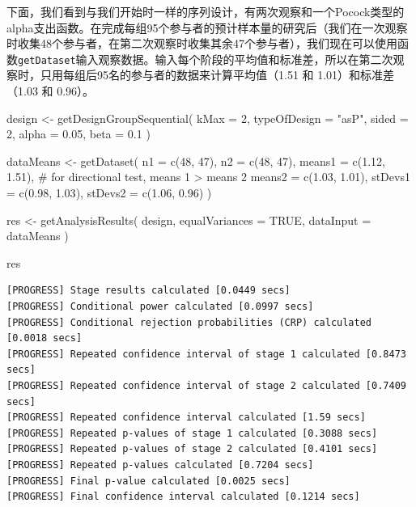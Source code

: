 \documentclass[
  letterpaper,
  DIV=11,
  numbers=noendperiod]{scrreprt}
\newenvironment{Shaded}{\begin{snugshade}}{\end{snugshade}}
\newcommand{\AttributeTok}[1]{\textcolor[rgb]{0.40,0.45,0.13}{#1}}
\newcommand{\CommentTok}[1]{\textcolor[rgb]{0.37,0.37,0.37}{#1}}
\newcommand{\ConstantTok}[1]{\textcolor[rgb]{0.56,0.35,0.01}{#1}}
\newcommand{\DecValTok}[1]{\textcolor[rgb]{0.68,0.00,0.00}{#1}}
\newcommand{\FloatTok}[1]{\textcolor[rgb]{0.68,0.00,0.00}{#1}}
\newcommand{\FunctionTok}[1]{\textcolor[rgb]{0.28,0.35,0.67}{#1}}
\newcommand{\NormalTok}[1]{\textcolor[rgb]{0.00,0.23,0.31}{#1}}
\newcommand{\OtherTok}[1]{\textcolor[rgb]{0.00,0.23,0.31}{#1}}
\newcommand{\StringTok}[1]{\textcolor[rgb]{0.13,0.47,0.30}{#1}}
\begin{document}
下面，我们看到与我们开始时一样的序列设计，有两次观察和一个Pocock类型的alpha支出函数。在完成每组95个参与者的预计样本量的研究后（我们在一次观察时收集48个参与者，在第二次观察时收集其余47个参与者），我们现在可以使用函数\texttt{getDataset}输入观察数据。输入每个阶段的平均值和标准差，所以在第二次观察时，只用每组后95名的参与者的数据来计算平均值（1.51
和 1.01）和标准差（1.03 和 0.96）。

\begin{Shaded}
\begin{Highlighting}[]
\NormalTok{design }\OtherTok{\textless{}{-}} \FunctionTok{getDesignGroupSequential}\NormalTok{(}
  \AttributeTok{kMax =} \DecValTok{2}\NormalTok{,}
  \AttributeTok{typeOfDesign =} \StringTok{"asP"}\NormalTok{,}
  \AttributeTok{sided =} \DecValTok{2}\NormalTok{,}
  \AttributeTok{alpha =} \FloatTok{0.05}\NormalTok{,}
  \AttributeTok{beta =} \FloatTok{0.1}
\NormalTok{)}

\NormalTok{dataMeans }\OtherTok{\textless{}{-}} \FunctionTok{getDataset}\NormalTok{(}
  \AttributeTok{n1 =} \FunctionTok{c}\NormalTok{(}\DecValTok{48}\NormalTok{, }\DecValTok{47}\NormalTok{), }
  \AttributeTok{n2 =} \FunctionTok{c}\NormalTok{(}\DecValTok{48}\NormalTok{, }\DecValTok{47}\NormalTok{), }
  \AttributeTok{means1 =} \FunctionTok{c}\NormalTok{(}\FloatTok{1.12}\NormalTok{, }\FloatTok{1.51}\NormalTok{), }\CommentTok{\# for directional test, means 1 \textgreater{} means 2}
  \AttributeTok{means2 =} \FunctionTok{c}\NormalTok{(}\FloatTok{1.03}\NormalTok{, }\FloatTok{1.01}\NormalTok{),}
  \AttributeTok{stDevs1 =} \FunctionTok{c}\NormalTok{(}\FloatTok{0.98}\NormalTok{, }\FloatTok{1.03}\NormalTok{), }
  \AttributeTok{stDevs2 =} \FunctionTok{c}\NormalTok{(}\FloatTok{1.06}\NormalTok{, }\FloatTok{0.96}\NormalTok{)}
\NormalTok{  )}

\NormalTok{res }\OtherTok{\textless{}{-}} \FunctionTok{getAnalysisResults}\NormalTok{(}
\NormalTok{  design, }
  \AttributeTok{equalVariances =} \ConstantTok{TRUE}\NormalTok{,}
  \AttributeTok{dataInput =}\NormalTok{ dataMeans}
\NormalTok{  )}

\NormalTok{res}
\end{Highlighting}
\end{Shaded}

\begin{verbatim}
[PROGRESS] Stage results calculated [0.0449 secs] 
[PROGRESS] Conditional power calculated [0.0997 secs] 
[PROGRESS] Conditional rejection probabilities (CRP) calculated [0.0018 secs] 
[PROGRESS] Repeated confidence interval of stage 1 calculated [0.8473 secs] 
[PROGRESS] Repeated confidence interval of stage 2 calculated [0.7409 secs] 
[PROGRESS] Repeated confidence interval calculated [1.59 secs] 
[PROGRESS] Repeated p-values of stage 1 calculated [0.3088 secs] 
[PROGRESS] Repeated p-values of stage 2 calculated [0.4101 secs] 
[PROGRESS] Repeated p-values calculated [0.7204 secs] 
[PROGRESS] Final p-value calculated [0.0025 secs] 
[PROGRESS] Final confidence interval calculated [0.1214 secs] 
\end{verbatim}
\end{document}
